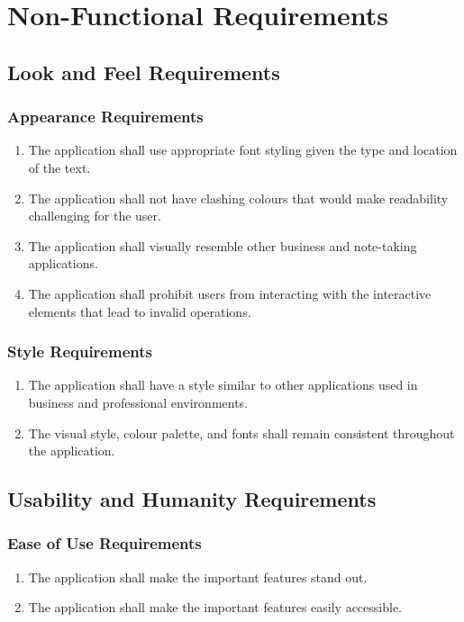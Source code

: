 \documentclass{article}
\begin{document}
\section{Non-Functional Requirements}
\subsection{Look and Feel Requirements}
\subsubsection{Appearance Requirements}
\begin{enumerate}[{A}PR1]
    \item The application shall use appropriate font styling given the type and location of the text.
    \item The application shall not have clashing colours that would make readability challenging for the user.
    \item The application shall visually resemble other business and note-taking applications.
    \item The application shall prohibit users from interacting with the interactive elements that lead to invalid operations.
\end{enumerate}

\subsubsection{Style Requirements}
\begin{enumerate}[STR1]
    \item The application shall have a style similar to other applications used in business and professional environments.
    \item The visual style, colour palette, and fonts shall remain consistent throughout the application.
\end{enumerate}

\subsection{Usability and Humanity Requirements}
\subsubsection{Ease of Use Requirements}
\begin{enumerate}[EUR1]
    \item The application shall make the important features stand out.
    \item The application shall make the important features easily accessible.
\end{enumerate}
\end{document}
